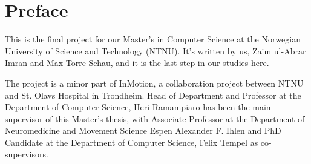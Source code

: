 \chapter*{Preface}
This is the final project for our Master's in Computer Science at the Norwegian University of Science and Technology (NTNU). It's written by us, Zaim ul-Abrar Imran and Max Torre Schau, and it is the last step in our studies here.

The project is a minor part of InMotion, a collaboration project between NTNU and St. Olavs Hospital in Trondheim. Head of Department and Professor at the Department of Computer Science, Heri Ramampiaro has been the main supervisor of this Master's thesis, with Associate Professor at the Department of Neuromedicine and Movement Science Espen Alexander F. Ihlen and  PhD Candidate at the Department of Computer Science, Felix Tempel as co-supervisors. 
